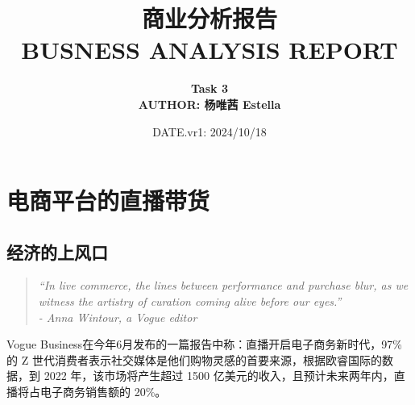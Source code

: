\documentclass[12pt]{ctexart}
\title{
\Huge{\textbf{商业分析报告}}\\
\Large{\textbf{BUSNESS ANALYSIS REPORT}}\\
\vspace{8mm}
}
\author{\textbf{Task 3} \\
\textbf{AUTHOR: 杨唯茜 Estella}\\
}
\date{DATE.vr1: 2024/10/18  \\
      }
\begin{document}
\maketitle
\thispagestyle{empty} %

\vspace{5mm}





\newpage
\clearpage
\thispagestyle{empty}
\thispagestyle{empty} %
\begin{titlepage}
{
\clearpage
\thispagestyle{empty}
  \color{black}
  \tableofcontents
}
\end{titlepage}
\newpage


\pagestyle{plain} 

\clearpage %

\section{电商平台的直播带货}

\subsection{经济的上风口}
\begin{quote}
    \textit{“In live commerce, the lines between performance and purchase blur, as we witness the artistry of curation coming alive before our eyes.”} \\
    \raggedleft \textit{- Anna Wintour, a Vogue editor}
\end{quote}

Vogue Business在今年6月发布的一篇报告\cite{1}中称：直播开启电子商务新时代，97\% 的 Z 世代消费者表示社交媒体是他们购物灵感的首要来源，根据欧睿国际的数据，到 2022 年，该市场将产生超过 1500 亿美元的收入，且预计未来两年内，直播将占电子商务销售额的 20\%。 
\end{document}
